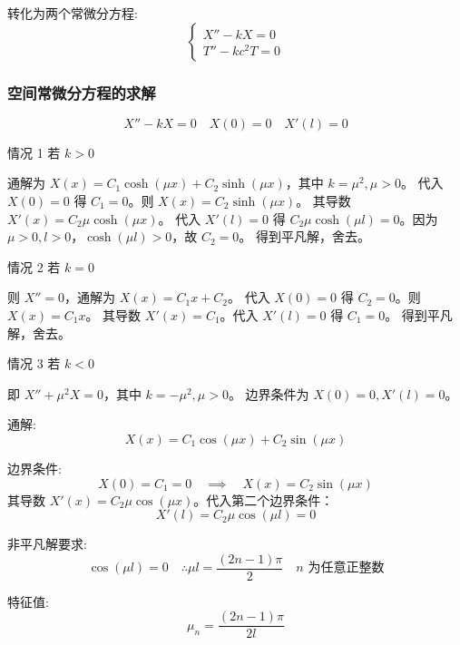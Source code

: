 \documentclass[12pt,a4paper]{article}
\numberwithin{subsection}{section}
\numberwithin{subsubsection}{subsection}
\theoremstyle{plain}
\theoremstyle{definition}
\theoremstyle{remark}
\begin{document}
	转化为两个常微分方程:
	\begin{equation} \label{eq:ode_mixed1}
		\begin{cases}
			X'' - kX = 0 \\
			T'' - k c^2 T = 0
		\end{cases}
	\end{equation}
	
	\subsubsection{空间常微分方程的求解}
	\begin{equation}
		X'' - kX = 0 \quad X(0) = 0 \quad X'(l) = 0
	\end{equation}
	
	情况 1 \quad 若 \(k > 0\)
	
	通解为 \(X(x) = C_1 \cosh(\mu x) + C_2 \sinh(\mu x)\)，其中 \(k = \mu^2, \mu>0\)。
	代入 $X(0)=0$ 得 $C_1=0$。则 $X(x) = C_2 \sinh(\mu x)$。
	其导数 $X'(x) = C_2 \mu \cosh(\mu x)$。
	代入 $X'(l)=0$ 得 $C_2 \mu \cosh(\mu l) = 0$。因为 $\mu>0, l>0$，$\cosh(\mu l)>0$，故 $C_2=0$。
	得到平凡解，舍去。
	
	情况 2 \quad 若 \(k = 0\)
	
	则 \(X'' = 0\)，通解为 $X(x) = C_1 x + C_2$。
	代入 $X(0)=0$ 得 $C_2=0$。则 $X(x) = C_1 x$。
	其导数 $X'(x) = C_1$。代入 $X'(l)=0$ 得 $C_1=0$。
	得到平凡解，舍去。
	
	情况 3 \quad 若 \(k < 0\)
	
	即 \(X'' + \mu^2 X = 0\)，其中 \(k = -\mu^2, \mu > 0\)。
	边界条件为 $X(0) = 0, X'(l) = 0$。
	
	通解:
	\begin{equation}
		X(x) = C_1 \cos(\mu x) + C_2 \sin(\mu x)
	\end{equation}
	
	边界条件:
	\begin{equation}
		X(0) = C_1 = 0 \quad \implies \quad X(x) = C_2 \sin(\mu x)
	\end{equation}
	其导数 $X'(x) = C_2 \mu \cos(\mu x)$。代入第二个边界条件：
	\begin{equation}
		X'(l) = C_2 \mu \cos(\mu l) = 0
	\end{equation}
	
	非平凡解要求:
	\begin{equation*}
		\cos(\mu l) = 0 \quad \therefore \mu l = \frac{(2n-1)\pi}{2} \quad n \text{ 为任意正整数}
	\end{equation*}
	
	特征值:
	\begin{equation}
		\mu_n = \frac{(2n-1)\pi}{2l}
	\end{equation}
	
\end{document}
